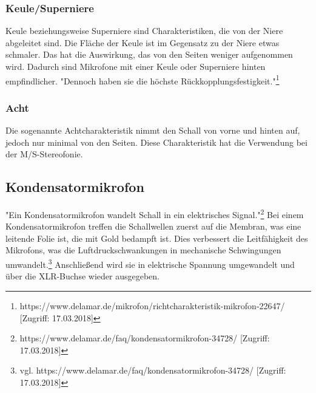 \subsubsection{Keule/Superniere}
Keule beziehungsweise Superniere sind Charakteristiken, die von der Niere abgeleitet sind. Die Fläche der Keule ist im Gegensatz zu der Niere etwas schmaler. Das hat die Auswirkung, das von den Seiten weniger aufgenommen wird. Dadurch sind Mikrofone mit einer Keule oder Superniere hinten empfindlicher. "Dennoch haben sie die höchste Rückkopplungsfestigkeit."\footnote{\label{}https://www.delamar.de/mikrofon/richtcharakteristik-mikrofon-22647/ [Zugriff: 17.03.2018]}
\subsubsection{Acht}
Die sogenannte Achtcharakteristik nimmt den Schall von vorne und hinten auf, jedoch nur minimal von den Seiten. Diese Charakteristik hat die Verwendung bei der M/S-Stereofonie. 
\subsection{Kondensatormikrofon}
"Ein Kondensatormikrofon wandelt Schall in ein elektrisches Signal."\footnote{\label{}https://www.delamar.de/faq/kondensatormikrofon-34728/ [Zugriff: 17.03.2018]} Bei einem Kondensatormikrofon treffen die Schallwellen zuerst auf die Membran, was eine leitende Folie ist, die mit Gold bedampft ist. Dies verbessert die  Leitfähigkeit des Mikrofons, was die Luftdruckschwankungen in mechanische Schwingungen umwandelt.\footnote{\label{}vgl. https://www.delamar.de/faq/kondensatormikrofon-34728/ [Zugriff: 17.03.2018]} Anschließend wird sie in elektrische Spannung umgewandelt und über die XLR-Buchse wieder ausgegeben. 
